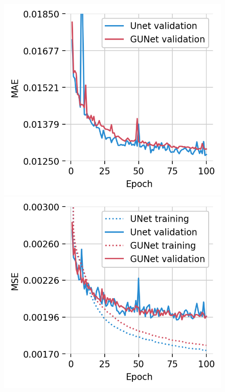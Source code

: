 \begin{figure}[ht]
\begin{subcaptionblock}[t]{0.49\textwidth}
        \caption{\label{fig:val_ssim_duration}}
    \end{subcaptionblock}
    \begin{subcaptionblock}[t]{0.49\textwidth}
        \centering
        \includegraphics[width=\textwidth]{images/val_mae_epoch.png}
        \caption{\label{fig:val_mae_epoch}}
    \end{subcaptionblock}
    \begin{subcaptionblock}[t]{0.49\textwidth}
        \centering
        \includegraphics[width=\textwidth]{images/train_val_mse_epoch.png}

\end{subcaptionblock}
\end{figure}
